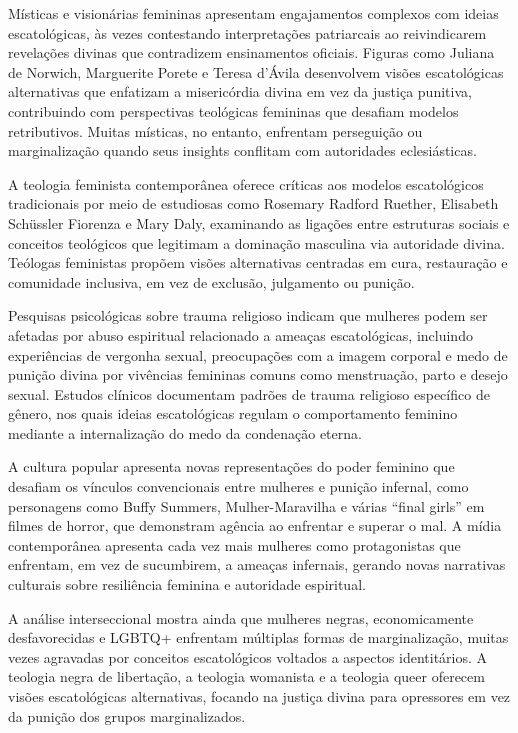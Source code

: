 Místicas e visionárias femininas apresentam engajamentos complexos com ideias escatológicas, às vezes contestando interpretações patriarcais ao reivindicarem revelações divinas que contradizem ensinamentos oficiais. Figuras como Juliana de Norwich, Marguerite Porete e Teresa d’Ávila desenvolvem visões escatológicas alternativas que enfatizam a misericórdia divina em vez da justiça punitiva, contribuindo com perspectivas teológicas femininas que desafiam modelos retributivos. Muitas místicas, no entanto, enfrentam perseguição ou marginalização quando seus insights conflitam com autoridades eclesiásticas.

A teologia feminista contemporânea oferece críticas aos modelos escatológicos tradicionais por meio de estudiosas como Rosemary Radford Ruether, Elisabeth Schüssler Fiorenza e Mary Daly, examinando as ligações entre estruturas sociais e conceitos teológicos que legitimam a dominação masculina via autoridade divina. Teólogas feministas propõem visões alternativas centradas em cura, restauração e comunidade inclusiva, em vez de exclusão, julgamento ou punição.

Pesquisas psicológicas sobre trauma religioso indicam que mulheres podem ser afetadas por abuso espiritual relacionado a ameaças escatológicas, incluindo experiências de vergonha sexual, preocupações com a imagem corporal e medo de punição divina por vivências femininas comuns como menstruação, parto e desejo sexual. Estudos clínicos documentam padrões de trauma religioso específico de gênero, nos quais ideias escatológicas regulam o comportamento feminino mediante a internalização do medo da condenação eterna.

A cultura popular apresenta novas representações do poder feminino que desafiam os vínculos convencionais entre mulheres e punição infernal, como personagens como Buffy Summers, Mulher-Maravilha e várias “final girls” em filmes de horror, que demonstram agência ao enfrentar e superar o mal. A mídia contemporânea apresenta cada vez mais mulheres como protagonistas que enfrentam, em vez de sucumbirem, a ameaças infernais, gerando novas narrativas culturais sobre resiliência feminina e autoridade espiritual.

A análise interseccional mostra ainda que mulheres negras, economicamente desfavorecidas e LGBTQ+ enfrentam múltiplas formas de marginalização, muitas vezes agravadas por conceitos escatológicos voltados a aspectos identitários. A teologia negra de libertação, a teologia womanista e a teologia queer oferecem visões escatológicas alternativas, focando na justiça divina para opressores em vez da punição dos grupos marginalizados.


